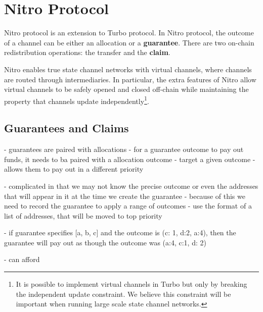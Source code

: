 \section{Nitro Protocol}

Nitro protocol is an extension to Turbo protocol.
In Nitro protocol, the outcome of a channel can be either an allocation or a \textbf{guarantee}.
There are two on-chain redistribution operations: the transfer and the \textbf{claim}.

Nitro enables true state channel networks with virtual channels, where channels are routed through intermediaries.
In particular, the extra features of Nitro allow virtual channels to be safely opened and closed off-chain while maintaining the property that channels update independently\footnote{It is possible to implement virtual channels in Turbo but only by breaking the independent update constraint. We believe this constraint will be important when running large scale state channel networks.}.

\subsection{Guarantees and Claims}

- guarantees are paired with allocations
- for a guarantee outcome to pay out funds, it needs to ba paired with a allocation outcome
- target a given outcome 
- allows them to pay out in a different priority

- complicated in that we may not know the precise outcome or even the addresses that will appear in it at the time we create the guarantee
- because of this we need to record the guarantee to apply a range of outcomes
- use the format of a list of addresses, that will be moved to top priority

- if guarantee specifies [a, b, c] and the outcome is (c: 1, d:2, a:4), then the guarantee will pay out as though the outcome was (a:4, c:1, d: 2)

- can afford


